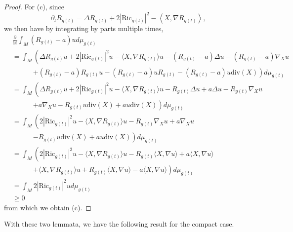 \documentclass[12pt]{amsart}
\theoremstyle{plain}
\theoremstyle{plain}
\theoremstyle{definition}
\theoremstyle{remark}
\numberwithin{equation}{subsection}
\newcommand{\del}{\nabla}
\begin{document}
\begin{proof}
    For (c), since
    \begin{equation*}
        \partial_t R_{g(t)} = \Delta R_{g(t)} + 2|\text{Ric}_{g(t)}|^2 - \left\langle X, \del R_{g(t)}\right\rangle,
    \end{equation*}
    we then have by integrating by parts multiple times,
    \begin{align*}
        &\frac{\partial}{\partial t} \int_M (R_{g(t)}-a)ud\mu_{g(t)} \nonumber \\
        &= \int_M \left(\Delta R_{g(t)} u + 2|\text{Ric}_{g(t)}|^2 u - \langle X, \del R_{g(t)}\rangle u - (R_{g(t)} - a)\Delta u - (R_{g(t)} - a)\del_X u \right. \nonumber \\
        &\qquad\quad \left. + (R_{g(t)} - a)R_{g(t)}u - (R_{g(t)} - a)uR_{g(t)} - (R_{g(t)} - a)u\text{div}(X)\right)d\mu_{g(t)} \nonumber \\
        &= \int_M \left( \Delta R_{g(t)} u + 2 |\text{Ric}_{g(t)}|^2 u - \langle X, \del R_{g(t)}\rangle u - R_{g(t)}\Delta u + a\Delta u - R_{g(t)}\del_Xu \right. \nonumber \\
        &\qquad\quad \left. + a\del_Xu - R_{g(t)}u\text{div}(X) + au\text{div}(X)\right)d\mu_{g(t)} \nonumber \\
        &= \int_M \left(2 |\text{Ric}_{g(t)}|^2 u - \langle X, \del R_{g(t)}\rangle u - R_{g(t)}\del_Xu + a\del_Xu \right. \nonumber \\
        &\qquad\quad \left. - R_{g(t)}u\text{div}(X) + au\text{div}(X)\right)d\mu_{g(t)} \nonumber \\
        &= \int_M \left(2 |\text{Ric}_{g(t)}|^2 u - \langle X, \del R_{g(t)}\rangle u - R_{g(t)}\langle X, \del u \rangle + a\langle X, \del u\rangle \right. \nonumber \\
        &\qquad\quad \left. + \langle X, \del R_{g(t)}\rangle u + R_{g(t)}\langle X, \del u\rangle - a \langle X, \del u\rangle\right)d\mu_{g(t)} \nonumber \\
        &= \int_M 2|\text{Ric}_{g(t)}|^2 ud\mu_{g(t)} \nonumber \\
        &\geq 0
    \end{align*}
    from which we obtain (c).
\end{proof}

With these two lemmata, we have the following result for the compact case.
\end{document}
